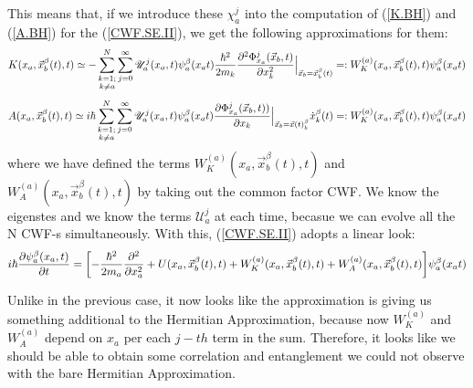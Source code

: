 \documentclass[11pt, a4paper]{article} %
\newcommand{\U}{\mathscr{U}}
\begin{document}
This means that, if we introduce these $\chi^j_a$ into the computation of (\ref{K.BH}) and (\ref{A.BH}) for the (\ref{CWF.SE.II}), we get the following approximations for them:
$$
K(x_a, \vec{x}_b^\beta(t), t) \simeq - \sum_{\substack{k=1; \\ k\neq a}}^{N} \sum_{j=0}^\infty \U^j_a(x_a,t)\psi_a^\beta(x_a t) \frac{\hbar^2}{2m_k} \pdv[2]{ \Phi_{x_a}^j(\vec{x}_b,t)}{x_k}\Big\rvert_{\vec{x}_b=\vec{x}_b^\beta(t)}=:W_K^{(a)}(x_a, \vec{x}_b^\beta (t),t)\psi_a^\beta(x_a t)
$$
$$
A(x_a, \vec{x}_b^\beta(t), t) \simeq i \hbar \sum_{\substack{k=1; \\ k\neq a}}^{N} \sum_{j=0}^\infty \U^j_a(x_a,t)\psi_a^\beta(x_a t) \pdv{ \Phi_{x_a}^j(\vec{x}_b,t))}{x_k}\Big\rvert_{\vec{x}_b=\vec{x}(t)_b^\beta} \dot{x}_k^\beta(t)=:W_K^{(a)}(x_a, \vec{x}_b^\beta (t),t)\psi_a^\beta(x_a t)
$$
where we have defined the terms $W_K^{(a)}(x_a, \vec{x}_b^\beta (t),t)$ and $W_A^{(a)}(x_a, \vec{x}_b^\beta (t),t)$ by taking out the common factor CWF. We know the eigenstes and we know the terms $\U^j_a$ at each time, becasue we can evolve all the N CWF-s simultaneously. With this, (\ref{CWF.SE.II}) adopts a linear look:
$$
i\hbar \pdv{\psi_a^\beta(x_a, t)}{t} = \qty[- \frac{\hbar^2}{2m_a}\pdv[2]{}{x_a} + U(x_a, \vec{x}_b^\beta(t), t)+ W^{(a)}_K(x_a,\vec{x}_b^\beta (t),t) +W^{(a)}_A(x_a,\vec{x}_b^\beta (t),t) ]\psi_a^\beta(x_a t)
$$

Unlike in the previous case, it now looks like the approximation is giving us something additional to the Hermitian Approximation, because now $W^{(a)}_K$ and $W^{(a)}_A$ depend on $x_a$ per each $j-th$ term in the sum. Therefore, it looks like we should be able to obtain some correlation and entanglement we could not observe with the bare Hermitian Approximation.
\end{document}
